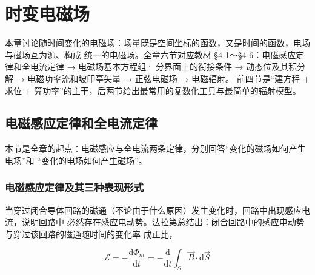 ﻿%

\makeatletter
{}
\makeatother

\chapter{时变电磁场}

本章讨论随时间变化的电磁场：场量既是空间坐标的函数，又是时间的函数，电场与磁场互为源、构成
统一的电磁场。全章六节对应教材 \S 4-1～\S 4-6：电磁感应定律和全电流定律 → 电磁场基本方程组·
分界面上的衔接条件 → 动态位及其积分解 → 电磁功率流和坡印亭矢量 → 正弦电磁场 → 电磁辐射。
前四节是“建方程 + 求位 + 算功率”的主干，后两节给出最常用的复数化工具与最简单的辐射模型。

\section{电磁感应定律和全电流定律}

本节是全章的起点：电磁感应与全电流两条定律，分别回答“变化的磁场如何产生电场”和
“变化的电场如何产生磁场”。

\subsection{电磁感应定律及其三种表现形式}

当穿过闭合导体回路的磁通（不论由于什么原因）发生变化时，回路中出现感应电流，说明回路中
必然存在感应电动势。法拉第总结出：闭合回路中的感应电动势与穿过该回路的磁通随时间的变化率
成正比，

\begin{formulaBox}
\[
\mathcal{E}=-\frac{\mathrm{d}\Phi_m}{\mathrm{d}t}
=-\frac{\mathrm{d}}{\mathrm{d}t}\int_{S}\vec{B}\cdot \mathrm{d}\vec{S}
\]
\end{formulaBox}

